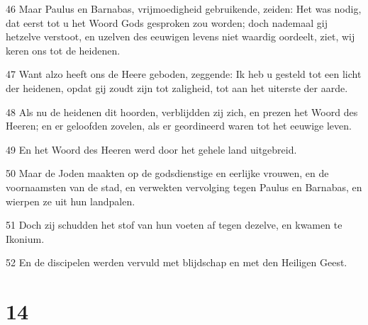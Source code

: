 \par 46 Maar Paulus en Barnabas, vrijmoedigheid gebruikende, zeiden: Het was nodig, dat eerst tot u het Woord Gods gesproken zou worden; doch nademaal gij hetzelve verstoot, en uzelven des eeuwigen levens niet waardig oordeelt, ziet, wij keren ons tot de heidenen.
\par 47 Want alzo heeft ons de Heere geboden, zeggende: Ik heb u gesteld tot een licht der heidenen, opdat gij zoudt zijn tot zaligheid, tot aan het uiterste der aarde.
\par 48 Als nu de heidenen dit hoorden, verblijdden zij zich, en prezen het Woord des Heeren; en er geloofden zovelen, als er geordineerd waren tot het eeuwige leven.
\par 49 En het Woord des Heeren werd door het gehele land uitgebreid.
\par 50 Maar de Joden maakten op de godsdienstige en eerlijke vrouwen, en de voornaamsten van de stad, en verwekten vervolging tegen Paulus en Barnabas, en wierpen ze uit hun landpalen.
\par 51 Doch zij schudden het stof van hun voeten af tegen dezelve, en kwamen te Ikonium.
\par 52 En de discipelen werden vervuld met blijdschap en met den Heiligen Geest.

\chapter{14}

